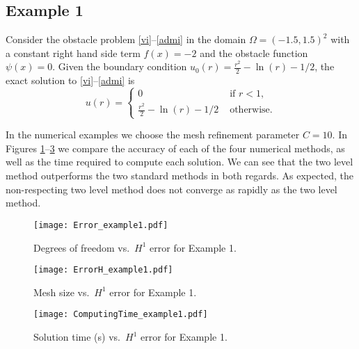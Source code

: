 \documentclass[12pt]{article}
\begin{document}
\subsection{Example 1}
Consider the obstacle problem \eqref{vi}--\eqref{admi} in the domain $\Omega=(-1.5,1.5)^2$ with 
a constant right hand side term $f(x)= -2$ and the obstacle function $\psi(x)=0$. Given the boundary
condition $u_0(r)=\frac{r^2}{2}-\ln(r)-1/2$, the exact solution to \eqref{vi}--\eqref{admi} is
\begin{equation*}
u(r)=  \begin{cases}
  0 &\text{ if } r<1,\\
  \frac{r^2}{2}-\ln(r)-1/2 & \text{ otherwise.}
\end{cases}
\end{equation*}

In the numerical examples we choose the mesh refinement parameter $C=10$.  
In Figures \ref{fig:example1-error}--\ref{fig:example1-time} we compare the
accuracy of each of the four numerical methods, as well as the time
required to compute each solution.  We can see that the two level
method outperforms the two standard methods in both regards.  As expected,
the non-respecting two level method does not converge as rapidly as the two level method. 




\begin{figure}
\centering
\texttt{[image: Error\_example1.pdf]}
\caption{Degrees of freedom vs.\ $H^1$ error for Example 1.}
\label{fig:example1-error}
\end{figure}

\begin{figure}
\centering
\texttt{[image: ErrorH\_example1.pdf]}
\caption{Mesh size vs.\ $H^1$ error for Example 1.}
\label{fig:example1-herror}
\end{figure}


\begin{figure}
\centering
\texttt{[image: ComputingTime\_example1.pdf]}
\caption{Solution time (s) vs.\ $H^1$ error for Example 1.}
\label{fig:example1-time}
\end{figure}
\end{document}
